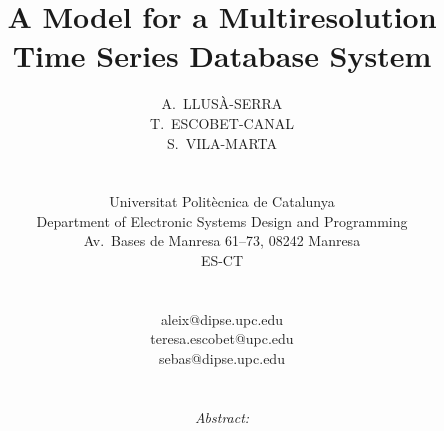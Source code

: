 \documentclass[twocolumn,11pt,a4paper]{article}
\begin{document}
\global\def\refname{{\normalsize \it References:}}
%
\baselineskip 12.5pt
%
%
%
\title{\LARGE \bf A Model for a Multiresolution Time Series Database
  System}

\date{}

\author{\hspace*{-10pt}
  \begin{minipage}[t]{2.3in} \normalsize \baselineskip 12.5pt
    \centerline{\scshape A.~LLUSÀ-SERRA}
  \end{minipage} \kern 0in
  \begin{minipage}[t]{2.3in} \normalsize \baselineskip 12.5pt
    \centerline{\scshape T.~ESCOBET-CANAL}
  \end{minipage} \kern 0in
  \begin{minipage}[t]{2.3in} \normalsize \baselineskip 12.5pt
    \centerline{\scshape S.~VILA-MARTA}
  \end{minipage} \\ \hspace*{-10pt}
  \begin{minipage}[t]{2.7in} \normalsize \baselineskip 12.5pt
    \centerline{Universitat Politècnica de Catalunya}
    \centerline{Department of Electronic Systems Design and Programming}
    \centerline{Av.~Bases de Manresa 61--73, 08242 Manresa}
    \centerline{\scshape ES-CT}
  \end{minipage}
  \\[14pt]
  \begin{minipage}[t]{2.3in} \normalsize \baselineskip 12.5pt
    \centerline{aleix@dipse.upc.edu}
  \end{minipage} \kern 0in
  \begin{minipage}[t]{2.3in} \normalsize \baselineskip 12.5pt
    \centerline{teresa.escobet@upc.edu}
  \end{minipage} \kern 0in
  \begin{minipage}[t]{2.3in} \normalsize \baselineskip 12.5pt
    \centerline{sebas@dipse.upc.edu}
  \end{minipage} 
  \\[5pt]
  \begin{minipage}[b]{6.9in} \normalsize
    \baselineskip 12.5pt {\it Abstract:}

\end{minipage}}
\end{document}
